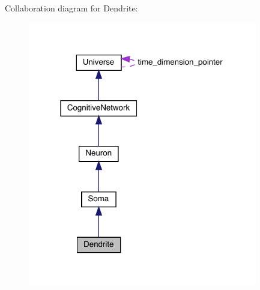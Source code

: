 Collaboration diagram for Dendrite\+:
\nopagebreak
\begin{figure}[H]
\begin{center}
\leavevmode
\includegraphics[width=283pt]{class_dendrite__coll__graph}
\end{center}
\end{figure}

